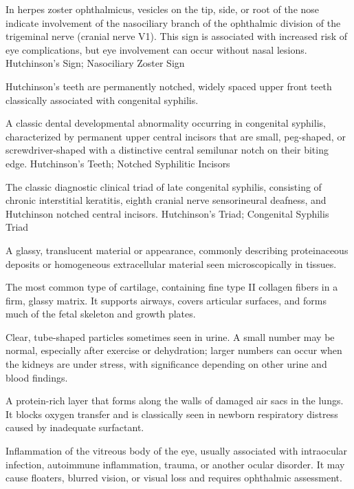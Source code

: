  In herpes zoster ophthalmicus, vesicles on the tip, side, or root of the nose indicate involvement of the nasociliary branch of the ophthalmic division of the trigeminal nerve (cranial nerve V1). This sign is associated with increased risk of eye complications, but eye involvement can occur without nasal lesions.
\synonyms
Hutchinson's Sign; Nasociliary Zoster Sign

 Hutchinson's teeth are permanently notched, widely spaced upper front teeth classically associated with congenital syphilis.

 A classic dental developmental abnormality occurring in congenital syphilis, characterized by permanent upper central incisors that are small, peg-shaped, or screwdriver-shaped with a distinctive central semilunar notch on their biting edge.
\synonyms
Hutchinson's Teeth; Notched Syphilitic Incisors

 The classic diagnostic clinical triad of late congenital syphilis, consisting of chronic interstitial keratitis, eighth cranial nerve sensorineural deafness, and Hutchinson notched central incisors.
\synonyms
Hutchinson's Triad; Congenital Syphilis Triad

 A glassy, translucent material or appearance, commonly describing proteinaceous deposits or homogeneous extracellular material seen microscopically in tissues.

 The most common type of cartilage, containing fine type II collagen fibers in a firm,
glassy matrix. It supports airways, covers articular surfaces, and forms much of the
fetal skeleton and growth plates.

 Clear, tube-shaped particles sometimes seen in urine. A small number may be normal, especially after exercise or dehydration; larger numbers can occur when the kidneys are under stress, with significance depending on other urine and blood findings.

 A protein-rich layer that forms along the walls of damaged air sacs in the lungs. It blocks oxygen transfer and is classically seen in newborn respiratory distress caused by inadequate surfactant.

 Inflammation of the vitreous body of the eye, usually associated with intraocular infection, autoimmune inflammation, trauma, or another ocular disorder. It may cause floaters, blurred vision, or visual loss and requires ophthalmic assessment.

